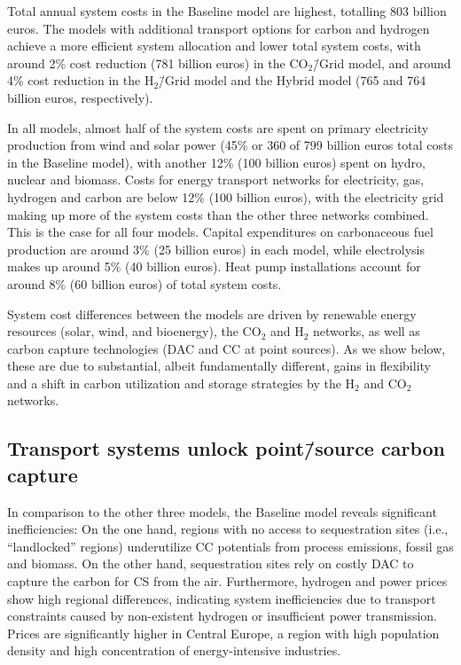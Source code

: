 \documentclass[twocolumn]{article}
\newcommand{\COtwo}{CO$_2$}
\newcommand{\Htwo}{H$_2$}
\newcommand{\modBase}{Baseline model}
\newcommand{\modCO}{CO$_2$\=/Grid model}
\newcommand{\modH}{H$_2$\=/Grid model}
\newcommand{\modHybrid}{Hybrid model}
\begin{document}
Total annual system costs in the \modBase{} are highest, totalling \label{}803 billion euros. The models with additional transport options for carbon and hydrogen achieve a more efficient system allocation and lower total system costs, with around \label{}2\% cost reduction (\label{}781 billion euros) in the \modCO{}, and around \label{}4\% cost reduction in the \modH{} and the \modHybrid{} (\label{}765 and \label{}764 billion euros, respectively).

In all models, almost half of the system costs are spent on primary electricity production from wind and solar power (\label{}45\% or \label{}360 of \label{}799 billion euros total costs in the \modBase{}), with another \label{}12\% (\label{}100 billion euros) spent on hydro, nuclear and biomass. Costs for energy transport networks for electricity, gas, hydrogen and carbon are below \label{}12\% (\label{}100 billion euros), with the electricity grid making up more of the system costs than the other three networks combined. This is the case for all four models. Capital expenditures on carbonaceous fuel production are around \label{}3\% (\label{}25 billion euros) in each model, while electrolysis makes up around \label{}5\% (\label{}40 billion euros). Heat pump installations account for around \label{}8\% (60 billion euros) of total system costs.

System cost differences between the models are driven by renewable energy resources (solar, wind, and bioenergy), the \COtwo{} and \Htwo{} networks, as well as carbon capture technologies (DAC and CC at point sources).
As we show below, these are due to substantial, albeit fundamentally different, gains in flexibility and a shift in carbon utilization and storage strategies by the \Htwo{} and \COtwo{} networks.

\subsection*{Transport systems unlock point\=/source carbon capture}

In comparison to the other three models, the \modBase{} reveals significant inefficiencies: On the one hand, regions with no access to sequestration sites (i.e., ``landlocked'' regions) underutilize CC potentials from process emissions, fossil gas and biomass. On the other hand, sequestration sites rely on costly DAC to capture the carbon for CS from the air. Furthermore, hydrogen and power prices show high regional differences, indicating system inefficiencies due to transport constraints caused by non-existent hydrogen or insufficient power transmission. Prices are significantly higher in Central Europe, a region with high population density and high concentration of energy-intensive industries.
\end{document}
